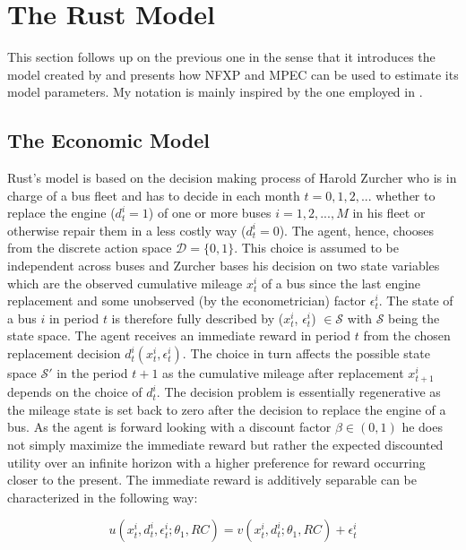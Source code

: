 \section{The Rust Model}
\thispagestyle{plain} %

This section follows up on the previous one in the sense that it introduces the model created by \cite{Rust.1987} and presents how NFXP and MPEC can be used to estimate its model parameters. My notation is mainly inspired by the one employed in \cite{Su.Judd.2012}.

\subsection{The Economic Model}

Rust's model is based on the decision making process of Harold Zurcher who is in charge of a bus fleet and has to decide in each month $t = 0, 1, 2, ...$ whether to replace the engine ($d^i_t=1$) of one or more buses $i = 1, 2, ..., M$ in his fleet or otherwise repair them in a less costly way ($d^i_t=0$). The agent, hence, chooses from the discrete action space $\mathcal{D} = \{0, 1\}$. This choice is assumed to be independent across buses and Zurcher bases his decision on two state variables which are the observed cumulative mileage $x^i_t$ of a bus since the last engine replacement and some unobserved (by the econometrician) factor $\epsilon^i_t$. The state of a bus $i$ in period $t$ is therefore fully described by ($x^i_t$, $\epsilon^i_t$) $\in \mathcal{S}$ with $\mathcal{S}$ being the state space. The agent receives an immediate reward in period $t$ from the chosen replacement decision $d^i_t(x^i_t, \epsilon^i_t)$. The choice in turn affects the possible state space $\mathcal{S'}$ in the period $t+1$ as the cumulative mileage after replacement $x^i_{t+1}$ depends on the choice of $d^i_t$. The decision problem is essentially regenerative as the mileage state is set back to zero after the decision to replace the engine of a bus. As the agent is forward looking with a discount factor $\beta \in (0, 1)$ he does not simply maximize the immediate reward but rather the expected discounted utility over an infinite horizon with a higher preference for reward occurring closer to the present. The immediate reward is additively separable can be characterized in the following way:

\begin{equation}
	u(x^i_t, d^i_t, \epsilon^i_t; \theta_1, RC) = v(x^i_t, d^i_t; \theta_1, RC) + \epsilon^i_t
\end{equation}


